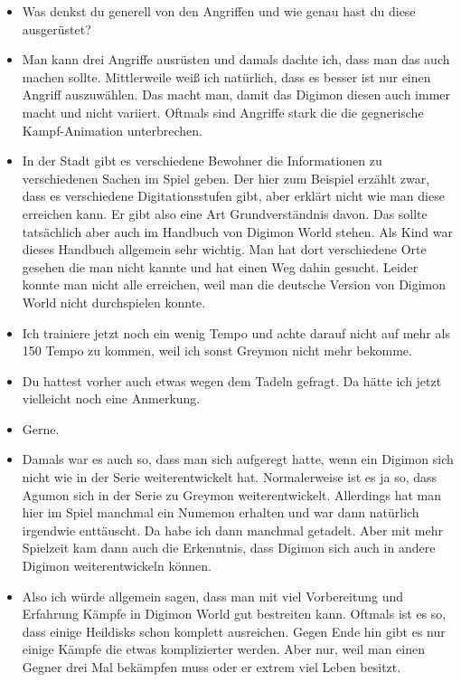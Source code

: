 {\begin{itemize}[]
    \item {} Was denkst du generell von den Angriffen und wie genau hast du diese ausgerüstet?
    \item {} Man kann drei Angriffe ausrüsten und damals dachte ich, dass man das auch machen sollte. Mittlerweile weiß ich natürlich, dass es besser ist nur einen Angriff auszuwählen. Das macht man, damit das Digimon diesen auch immer macht und nicht variiert. Oftmals sind Angriffe stark die die gegnerische Kampf-Animation unterbrechen. \item {} In der Stadt gibt es verschiedene Bewohner die Informationen zu verschiedenen Sachen im Spiel geben. Der hier zum Beispiel erzählt zwar, dass es verschiedene Digitationsstufen gibt, aber erklärt nicht wie man diese erreichen kann. Er gibt also eine Art Grundverständnis davon. Das sollte tatsächlich aber auch im Handbuch von Digimon World stehen. Als Kind war dieses Handbuch allgemein sehr wichtig. Man hat dort verschiedene Orte gesehen die man nicht kannte und hat einen Weg dahin gesucht. Leider konnte man nicht alle erreichen, weil man die deutsche Version von Digimon World nicht durchspielen konnte. 
    \item {} Ich trainiere jetzt noch ein wenig Tempo und achte darauf nicht auf mehr als 150 Tempo zu kommen, weil ich sonst Greymon nicht mehr bekomme.
    \item {} Du hattest vorher auch etwas wegen dem Tadeln gefragt. Da hätte ich jetzt vielleicht noch eine Anmerkung. 
    \item {} Gerne.
    \item {} Damals war es auch so, dass man sich aufgeregt hatte, wenn ein Digimon sich nicht wie in der Serie weiterentwickelt hat. Normalerweise ist es ja so, dass Agumon sich in der Serie zu Greymon weiterentwickelt. Allerdings hat man hier im Spiel manchmal ein Numemon erhalten und war dann natürlich irgendwie enttäuscht. Da habe ich dann manchmal getadelt. Aber mit mehr Spielzeit kam dann auch die Erkenntnis, dass Digimon sich auch in andere Digimon weiterentwickeln können. 
    \item {} Also ich würde allgemein sagen, dass man mit viel Vorbereitung und Erfahrung Kämpfe in Digimon World gut bestreiten kann. Oftmals ist es so, dass einige Heildisks schon komplett ausreichen. Gegen Ende hin gibt es nur einige Kämpfe die etwas komplizierter werden. Aber nur, weil man einen Gegner drei Mal bekämpfen muss oder er extrem viel Leben besitzt. 

\end{itemize}}
